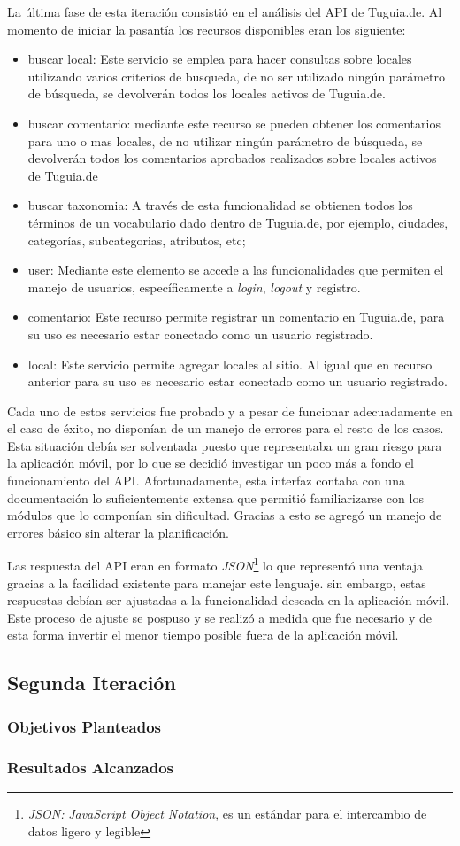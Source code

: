 La última fase de esta iteración consistió en el análisis del API de Tuguia.de. Al momento de iniciar la pasantía los recursos disponibles eran los siguiente:
\begin{itemize}
\item buscar local: Este servicio se emplea para hacer consultas sobre locales utilizando varios criterios de busqueda, de no ser utilizado ningún parámetro de búsqueda, se devolverán todos los locales activos de Tuguia.de.
\item buscar comentario: mediante este recurso se pueden obtener los comentarios para uno o mas locales, de no utilizar ningún parámetro de búsqueda, se devolverán todos los comentarios aprobados realizados sobre locales activos de Tuguia.de
\item buscar taxonomia: A través de esta funcionalidad se obtienen todos los términos de un vocabulario dado dentro de Tuguia.de, por ejemplo, ciudades, categorías, subcategorias, atributos, etc;
\item user: Mediante este elemento se accede a las funcionalidades que permiten el manejo de usuarios, específicamente a \textit{login}, \textit{logout} y registro.
\item comentario: Este recurso permite registrar un comentario en Tuguia.de, para su uso es necesario estar conectado como un usuario registrado.
\item local: Este servicio permite agregar locales al sitio. Al igual que en recurso anterior para su uso es necesario estar conectado como un usuario registrado.
\end{itemize}

Cada uno de estos servicios fue probado y a pesar de funcionar adecuadamente en el caso de éxito, no disponían de un manejo de errores para el resto de los casos. Esta situación debía ser solventada puesto que representaba un gran riesgo para la aplicación móvil, por lo que se decidió investigar un poco más a fondo el funcionamiento del API. Afortunadamente, esta interfaz contaba con una documentación lo suficientemente extensa que permitió familiarizarse con los módulos que lo componían sin dificultad. Gracias a esto se agregó un manejo de errores básico sin alterar la planificación.

Las respuesta del API eran en formato \textit{JSON}\footnote{\textit{JSON:} \textit{JavaScript Object Notation}, es un estándar para el intercambio de datos ligero y legible\cite{JSON}} lo que representó una ventaja gracias a la facilidad existente  para manejar este lenguaje. sin embargo, estas respuestas debían ser ajustadas a la funcionalidad deseada en la aplicación móvil. Este proceso de ajuste se pospuso y se realizó a medida que fue necesario y de esta forma invertir el menor tiempo posible fuera de la aplicación móvil.

\subsection{Segunda Iteración}


\subsubsection{Objetivos Planteados}
\subsubsection{Resultados Alcanzados}